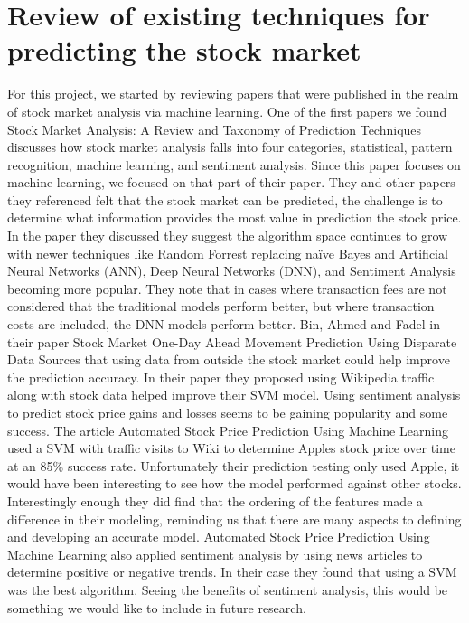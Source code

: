 \documentclass[conference]{IEEEtran}
\begin{document}
\section{Review of existing techniques for predicting the stock market}
For this project, we started by reviewing papers that were published in the realm of stock market analysis via machine learning.  One of the first papers we found Stock Market Analysis: A Review and Taxonomy of Prediction Techniques \cite{TaxonomyofPrediction} discusses how stock market analysis falls into four categories, statistical, pattern recognition, machine learning, and sentiment analysis.  Since this paper focuses on machine learning, we focused on that part of their paper.  They and other papers they referenced felt that the stock market can be predicted, the challenge is to determine what information provides the most value in prediction the stock price.  In the paper they discussed they suggest the algorithm space continues to grow with newer techniques like Random Forrest replacing naïve Bayes and  Artificial Neural Networks (ANN), Deep Neural Networks (DNN), and Sentiment Analysis becoming more popular.  They note that in cases where transaction fees are not considered that the traditional models perform better, but where transaction costs are included, the DNN models perform better. Bin, Ahmed and Fadel in their paper Stock Market One-Day Ahead Movement Prediction Using Disparate Data Sources\cite {Onedayahead} that using data from outside the stock market could help improve the prediction accuracy.  In their paper they proposed using Wikipedia traffic along with stock data helped improve their SVM model.  Using sentiment analysis to predict stock price gains and losses seems to be gaining popularity and some success.  The article Automated Stock Price Prediction Using Machine Learning \cite{AutomatedPrediction} used a SVM with traffic visits to Wiki to determine Apples stock price over time at an 85\% success rate. Unfortunately their prediction testing only used Apple, it would have been interesting to see how the model performed against other stocks.  Interestingly enough they did find that the ordering of the features made a difference in their modeling, reminding us that there are many aspects to defining and developing an accurate model.  Automated Stock Price Prediction Using Machine Learning \cite{AutomatedPrediction} also applied sentiment analysis by using news articles to determine positive or negative trends. In their case they found that using a SVM was the best algorithm.  Seeing the benefits of sentiment analysis, this would be something we would like to include in future research. 
\end{document}
